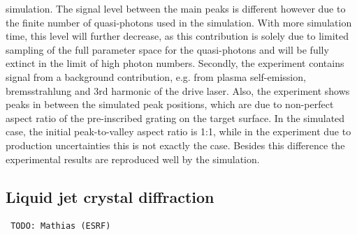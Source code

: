 \documentclass[10pt]{scrartcl}
\begin{document}
simulation.  The signal level between the main peaks is different however due to
the finite number of quasi-photons used in the simulation.  With more simulation
time, this level will further decrease, as this contribution is solely due to
limited sampling of the full parameter space for the quasi-photons and will be
fully extinct in the limit of high photon numbers.  Secondly, the experiment
contains signal from a background contribution, e.g. from plasma self-emission,
bremsstrahlung and 3rd harmonic of the drive laser.  Also, the experiment shows
peaks in between the simulated peak positions, which are due to non-perfect
aspect ratio of the pre-inscribed grating on the target surface.  In the
simulated case, the initial peak-to-valley aspect ratio is 1:1, while in the
experiment due to production uncertainties this is not exactly the case.
Besides this difference the experimental results are reproduced well by the
simulation.

%
\subsection{Liquid jet crystal diffraction\label{sec:liquid_crystals}}
\begin{verbatim} TODO: Mathias (ESRF) \end{verbatim}
\end{document}

